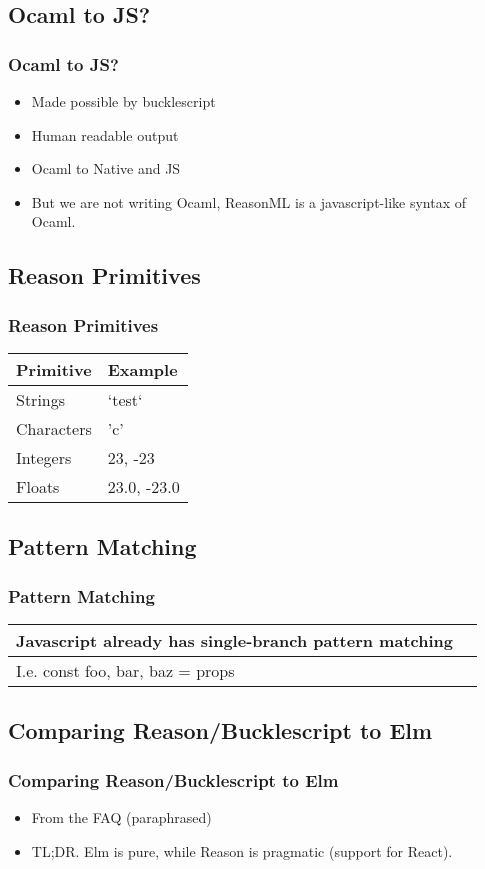 \documentclass{beamer}
\begin{document}
\begin{frame}
  \section{Ocaml to JS?}
  \frametitle{Ocaml to JS?}
  \pause
  \begin{itemize}
  \item Made possible by bucklescript
    \pause
  \item Human readable output
    \pause
  \item Ocaml to Native and JS
    \pause
  \item But we are not writing Ocaml, ReasonML is a javascript-like syntax of Ocaml.
  \end{itemize}
\end{frame}

\begin{frame}
  \section{Reason Primitives}
  \frametitle{Reason Primitives}
  \pause
    \begin{tabular}{ | l | p{5cm} |}
      \hline
      Primitive & Example \\ \hline
      Strings & `test` \\ \hline
      Characters & 'c' \\ \hline
      Integers & 23, -23 \\ \hline
      Floats & 23.0, -23.0 \\
      \hline
    \end{tabular}
\end{frame}

\begin{frame}
  \section{Pattern Matching}
  \frametitle{Pattern Matching}
  \pause
    \begin{tabular}{ | l | p{5cm} |}
      \hline
      Javascript already has single-branch pattern matching \\ \hline
      I.e. const {foo, bar, baz} = props \\ \hline
    \end{tabular}
\end{frame}

\begin{frame}
  \section{Comparing Reason/Bucklescript to Elm}
  \frametitle{Comparing Reason/Bucklescript to Elm}
  \pause
  \begin{itemize}
  \item From the FAQ (paraphrased)
    \pause
  \item TL;DR. Elm is pure, while Reason is pragmatic (support for React).
    \pause
  \end{itemize}
\end{frame}
\end{document}
